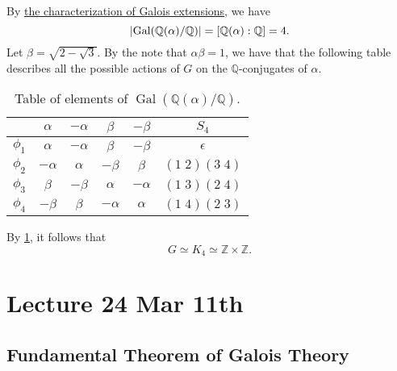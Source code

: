 \documentclass[notoc,notitlepage,nobib]{tufte-book}
\DeclareMathOperator{\Gal}{Gal}
\begin{document}
\begin{eg}
  By \hyperref[thm:characterization_of_galois_extensions]{the characterization
  of Galois extensions}, we have
  \begin{equation*}
    \abs{\Gal(\mathbb{Q}(\alpha)/\mathbb{Q})} = [\mathbb{Q}(\alpha) :
    \mathbb{Q}] = 4.
  \end{equation*}
  Let $\beta = \sqrt{2 - \sqrt{3}}$. By the note that $\alpha \beta = 1$, we
  have that the following table describes all the possible actions of $G$ on the
  $\mathbb{Q}$-conjugates of $\alpha$.
  \begin{table}[ht]
    \centering
    \caption{Table of elements of $\Gal(\mathbb{Q}(\alpha)/\mathbb{Q})$.}
    \label{table:table_of_elements_of_gal_q_alpha_q}
    \begin{tabular}{c | c c c c | c}
               & $\alpha$  & $-\alpha$ & $\beta$   & $-\beta$  & $S_4$ \\
      \hline
      $\phi_1$ & $\alpha$  & $-\alpha$ & $\beta$   & $-\beta$  & $\epsilon$ \\
      $\phi_2$ & $-\alpha$ & $\alpha$  & $-\beta$  & $\beta$   & $(1 \; 2)(3 \; 4)$ \\
      $\phi_3$ & $\beta$   & $-\beta$  & $\alpha$  & $-\alpha$ & $(1 \; 3)(2 \; 4)$ \\
      $\phi_4$ & $-\beta$  & $\beta$   & $-\alpha$ & $\alpha$  & $(1 \; 4)(2 \; 3)$
    \end{tabular}
  \end{table}

  By \cref{table:table_of_elements_of_gal_q_alpha_q}, it follows that
  \begin{equation*}
    G \simeq K_4 \simeq \mathbb{Z} \times \mathbb{Z}.
  \end{equation*}
\end{eg}



\chapter{Lecture 24 Mar 11th}%
\label{chp:lecture_24_mar_11th}

\section{Fundamental Theorem of Galois Theory}%
\label{sec:fundamental_theorem_of_galois_theory}
\end{document}
